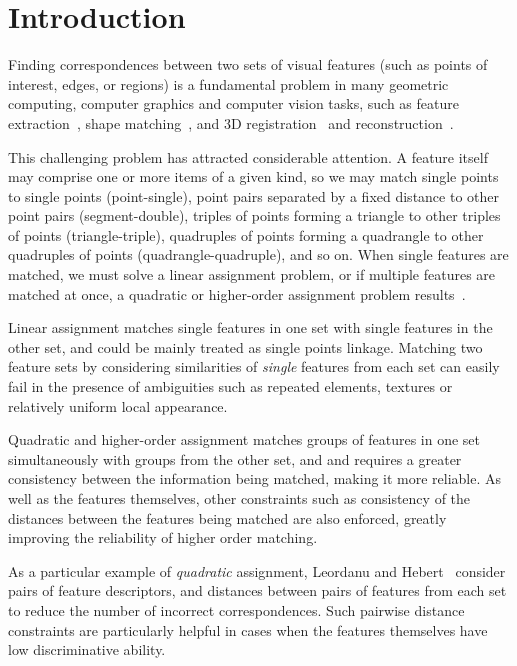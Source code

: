 \section{Introduction}
\label{sec:introduction}

Finding correspondences between two sets of visual features (such as points of interest, edges, or regions) is a fundamental problem in many geometric computing,
computer graphics and computer vision tasks, such as feature extraction~\cite{Lowe04, Berg05objectrecognition,Johnson99,Sun09},
shape matching~\cite{Zheng06robustpoint,Belongie02,Bronstein11,Shrivastava11}, and 3D registration~\cite{Aiger08} and reconstruction~\cite{Hartley04}.

This challenging problem has attracted considerable attention.
A feature itself may comprise one or more items of a given kind,
so we may match single points to single points (point-single),
point pairs separated by a fixed distance to other point pairs (segment-double),
triples of points forming a triangle to other triples of points (triangle-triple), 
quadruples of points forming a quadrangle to other quadruples of points (quadrangle-quadruple), and so on.
When single features are matched, 
we must solve a linear assignment problem, 
or if multiple features are matched at once, 
a quadratic or higher-order assignment problem results~\cite{Conte04}.

Linear assignment matches single features in one set with single features in the other set, and could be mainly treated as single points linkage.
Matching two feature sets by considering similarities of \emph{single} features from each set can easily fail in the presence of ambiguities such as repeated elements,
textures or relatively uniform local appearance.

Quadratic and higher-order assignment matches groups of features in one set simultaneously with groups from the other set,
and and requires a greater consistency between the information being matched, making it more reliable.
As well as the features themselves, other constraints such as consistency of the distances between the features being matched are also enforced, 
greatly improving the reliability of higher order matching.

As a particular example of \emph{quadratic} assignment, Leordanu and Hebert~\cite{Leordeanu05} consider pairs of feature descriptors,
and distances between pairs of features from each set to reduce the number of incorrect correspondences.
Such pairwise distance constraints are particularly helpful in cases when the features themselves have low discriminative ability.

